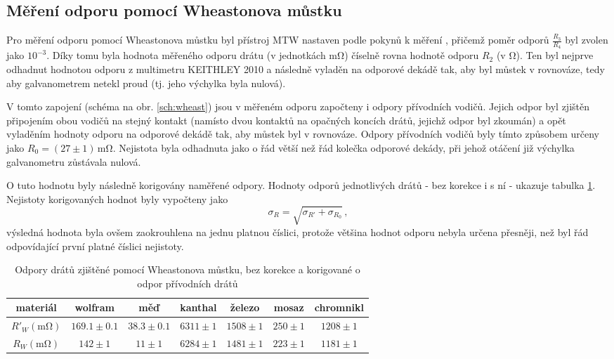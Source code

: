 \documentclass{../concepts/prepareprotokol} %
\begin{document}
\subsection{Měření odporu pomocí Wheastonova můstku} \label{wheaston}

Pro měření odporu pomocí Wheastonova můstku byl přístroj MTW nastaven podle pokynů k měření \cite{pokyny},
přičemž poměr odporů $\frac{R_3}{R_4}$ byl zvolen jako $10^{-3}$. Díky tomu byla hodnota měřeného odporu drátu 
(v jednotkách \si{\milli\ohm}) číselně rovna hodnotě odporu $R_2$ (v \si{\ohm}). Ten byl nejprve odhadnut
hodnotou odporu z multimetru KEITHLEY 2010 a následně vyladěn na odporové dekádě tak, aby byl můstek 
v rovnováze, tedy aby galvanometrem netekl proud (tj. jeho výchylka byla nulová).

V tomto zapojení (schéma na obr. \ref{sch:wheast}) jsou v měřeném odporu započteny i odpory přívodních vodičů. 
Jejich odpor byl zjištěn připojením obou vodičů na stejný kontakt (namísto dvou kontaktů na opačných koncích drátů, 
jejichž odpor byl zkoumán) a opět vyladěním hodnoty odporu na odporové dekádě tak, aby můstek byl v rovnováze.
Odpory přívodních vodičů byly tímto způsobem určeny jako $R_0 = (27 \pm 1) \, \si{\milli\ohm}$. Nejistota byla odhadnuta
jako o řád větší než řád kolečka odporové dekády, při jehož otáčení již výchylka galvanometru zůstávala nulová.

O tuto hodnotu byly následně korigovány naměřené odpory. Hodnoty odporů jednotlivých drátů - bez korekce i s ní -
ukazuje tabulka \ref{tab:wheaston}. Nejistoty korigovaných hodnot byly vypočteny jako
\begin{equation}
    \sigma_{R} = \sqrt{\sigma_{R'} + \sigma_{R_0}} \, ,
\end{equation}
výsledná hodnota byla ovšem zaokrouhlena na jednu platnou číslici, protože většina hodnot odporu nebyla určena přesněji, než byl řád odpovídající první platné číslici nejistoty.

\begin{table}[!hbtp]
\centering
\caption{Odpory drátů zjištěné pomocí Wheastonova můstku, bez korekce a korigované o odpor přívodních drátů}
\begin{tabular}{c|cccccc}
 \toprule
 materiál & wolfram & měď & kanthal & železo & mosaz & chromnikl \\
 \midrule
 $R'_W (\si{\milli\ohm})$ & $169.1 \pm 0.1$ & $38.3 \pm 0.1$ & $6311 \pm 1$ & $1508 \pm 1$ & $250 \pm 1$ & $1208 \pm 1$ \\
 $R_W (\si{\milli\ohm})$ & $142 \pm 1$ & $11 \pm 1$ & $6284 \pm 1$ & $1481 \pm 1$ & $223 \pm 1$ & $1181 \pm 1$ \\

 \bottomrule
\end{tabular}
\label{tab:wheaston}
\end{table}
\end{document}
